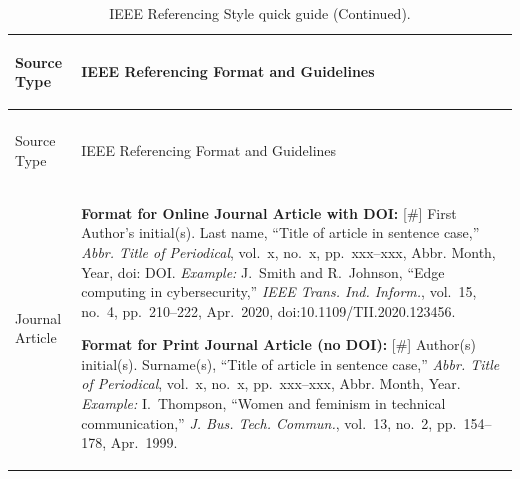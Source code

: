 \begin{xltabular}{\textwidth}{>{\bfseries\raggedright\arraybackslash}p{0.24\textwidth} >{\raggedright\arraybackslash}X}
  \caption{IEEE Referencing Style quick guide.} \label{tab:ieee-style-guide} \\
  \toprule
  Source Type & IEEE Referencing Format and Guidelines \\
  \midrule
  \endfirsthead
  \caption[]{IEEE Referencing Style quick guide (Continued).} \\
  \toprule
  Source Type & IEEE Referencing Format and Guidelines \\
  \midrule
  \endhead
  \bottomrule
  \endfoot

  Journal Article & 
  \textbf{Format for Online Journal Article with DOI:}\newline
  {[}\#] First Author's initial(s). Last name, ``Title of article in sentence case,'' \textit{Abbr. Title of Periodical}, vol.~x, no.~x, pp.~xxx--xxx, Abbr. Month, Year, doi: DOI.\newline
  \textit{Example:} J.~Smith and R.~Johnson, ``Edge computing in cybersecurity,'' \textit{IEEE Trans. Ind. Inform.}, vol.~15, no.~4, pp.~210--222, Apr.~2020, doi:10.1109/TII.2020.123456.\par\vspace{6pt}
  \textbf{Format for Print Journal Article (no DOI):}\newline
  {[}\#] Author(s) initial(s). Surname(s), ``Title of article in sentence case,'' \textit{Abbr. Title of Periodical}, vol.~x, no.~x, pp.~xxx--xxx, Abbr. Month, Year.\newline
  \textit{Example:} I.~Thompson, ``Women and feminism in technical communication,'' \textit{J. Bus. Tech. Commun.}, vol.~13, no.~2, pp.~154--178, Apr.~1999. \\
  \midrule


\end{xltabular}

